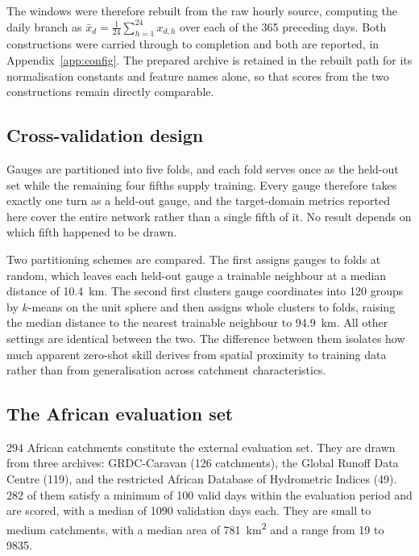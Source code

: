The windows were therefore rebuilt from the raw hourly source, computing the daily branch as
$\bar{x}_d = \frac{1}{24}\sum_{h=1}^{24} x_{d,h}$ over each of the \num{365} preceding days.
Both constructions were carried through to completion and both are reported, in
Appendix~\ref{app:config}. The prepared archive is retained in the rebuilt path for its
normalisation constants and feature names alone, so that scores from the two constructions
remain directly comparable.

\subsection{Cross-validation design}

Gauges are partitioned into five folds, and each fold serves once as the held-out set while
the remaining four fifths supply training. Every gauge therefore takes exactly one turn as a
held-out gauge, and the target-domain metrics reported here cover the entire network rather
than a single fifth of it. No result depends on which fifth happened to be drawn.

Two partitioning schemes are compared. The first assigns gauges to folds at random, which
leaves each held-out gauge a trainable neighbour at a median distance of \SI{10.4}{\km}. The
second first clusters gauge coordinates into \num{120} groups by $k$-means on the unit sphere
and then assigns whole clusters to folds, raising the median distance to the nearest
trainable neighbour to \SI{94.9}{\km}. All other settings are identical between the two. The
difference between them isolates how much apparent zero-shot skill derives from spatial
proximity to training data rather than from generalisation across catchment characteristics.

\subsection{The African evaluation set}

\num{294} African catchments constitute the external evaluation set. They are drawn from
three archives: GRDC-Caravan (\num{126} catchments), the Global Runoff Data Centre
(\num{119}), and the restricted African Database of Hydrometric Indices (\num{49}).
\num{282} of them satisfy a minimum of \num{100} valid days within the evaluation period and
are scored, with a median of \num{1090} validation days each. They are small to medium
catchments, with a median area of \SI{781}{\km\squared} and a range from \num{19} to
\num{9835}.

